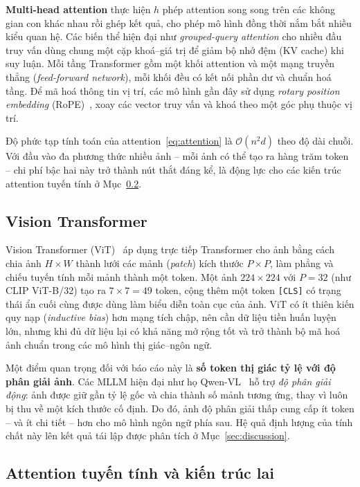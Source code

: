 \textbf{Multi-head attention} thực hiện $h$ phép attention song song trên các không gian con khác nhau rồi ghép kết quả, cho phép mô hình đồng thời nắm bắt nhiều kiểu quan hệ. Các biến thể hiện đại như \emph{grouped-query attention} cho nhiều đầu truy vấn dùng chung một cặp khoá--giá trị để giảm bộ nhớ đệm (KV cache) khi suy luận. Mỗi tầng Transformer gồm một khối attention và một mạng truyền thẳng (\emph{feed-forward network}), mỗi khối đều có kết nối phần dư và chuẩn hoá tầng. Để mã hoá thông tin vị trí, các mô hình gần đây sử dụng \emph{rotary position embedding} (RoPE)~\cite{su2024rope}, xoay các vector truy vấn và khoá theo một góc phụ thuộc vị trí.

Độ phức tạp tính toán của attention~\eqref{eq:attention} là $\mathcal{O}(n^2 d)$ theo độ dài chuỗi. Với đầu vào đa phương thức nhiều ảnh -- mỗi ảnh có thể tạo ra hàng trăm token -- chi phí bậc hai này trở thành nút thắt đáng kể, là động lực cho các kiến trúc attention tuyến tính ở Mục~\ref{sec:linear-attn}.

\subsection{Vision Transformer}

Vision Transformer (ViT)~\cite{dosovitskiy2021vit} áp dụng trực tiếp Transformer cho ảnh bằng cách chia ảnh $H \times W$ thành lưới các mảnh (\emph{patch}) kích thước $P \times P$, làm phẳng và chiếu tuyến tính mỗi mảnh thành một token. Một ảnh $224 \times 224$ với $P = 32$ (như CLIP ViT-B/32) tạo ra $7 \times 7 = 49$ token, cộng thêm một token \texttt{[CLS]} có trạng thái ẩn cuối cùng được dùng làm biểu diễn toàn cục của ảnh. ViT có ít thiên kiến quy nạp (\emph{inductive bias}) hơn mạng tích chập, nên cần dữ liệu tiền huấn luyện lớn, nhưng khi đủ dữ liệu lại có khả năng mở rộng tốt và trở thành bộ mã hoá ảnh chuẩn trong các mô hình thị giác--ngôn ngữ.

Một điểm quan trọng đối với báo cáo này là \textbf{số token thị giác tỷ lệ với độ phân giải ảnh}. Các MLLM hiện đại như họ Qwen-VL~\cite{wang2024qwen2vl} hỗ trợ \emph{độ phân giải động}: ảnh được giữ gần tỷ lệ gốc và chia thành số mảnh tương ứng, thay vì luôn bị thu về một kích thước cố định. Do đó, ảnh độ phân giải thấp cung cấp ít token -- và ít chi tiết -- hơn cho mô hình ngôn ngữ phía sau. Hệ quả định lượng của tính chất này lên kết quả tái lập được phân tích ở Mục~\ref{sec:discussion}.

\subsection{Attention tuyến tính và kiến trúc lai}\label{sec:linear-attn}

